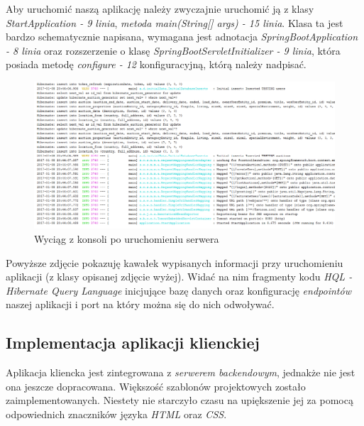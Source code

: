 \documentclass[10pt,titlepage]{article} %
\begin{document}
Aby uruchomić naszą aplikację należy zwyczajnie uruchomić ją z klasy \textit{StartApplication - 9 linia}, \textit{metoda main(String[] args) - 15 linia}. Klasa ta jest bardzo schematycznie napisana, wymagana jest adnotacja \textit{SpringBootApplication - 8 linia} oraz rozszerzenie o klasę \textit{SpringBootServletInitializer - 9 linia}, która posiada metodę \textit{configure - 12} konfiguracyjną, którą należy nadpisać.

\begin{figure}[H]
\includegraphics[width=1.0\textwidth, height=0.5\textheight]{img/sekcja3/backend/uruchomienieSerwera}
\caption[Wyciąg z konsoli po uruchomieniu serwera]{Wyciąg z konsoli po uruchomieniu serwera}
\end{figure}

Powyższe zdjęcie pokazuję kawałek wypisanych informacji przy uruchomieniu aplikacji (z klasy opisanej zdjęcie wyżej). Widać na nim fragmenty kodu \textit{HQL - Hibernate Query Language} inicjujące bazę danych oraz konfigurację \textit{endpointów} naszej aplikacji i port na który można się do nich odwoływać.



\subsection{Implementacja aplikacji klienckiej}
Aplikacja kliencka jest zintegrowana z \textit{serwerem backendowym}, jednakże nie jest ona jeszcze dopracowana. Większość szablonów projektowych zostało zaimplementowanych. Niestety nie starczyło czasu na upiększenie jej za pomocą odpowiednich znaczników języka \textit{HTML} oraz \textit{CSS}.
\end{document}
